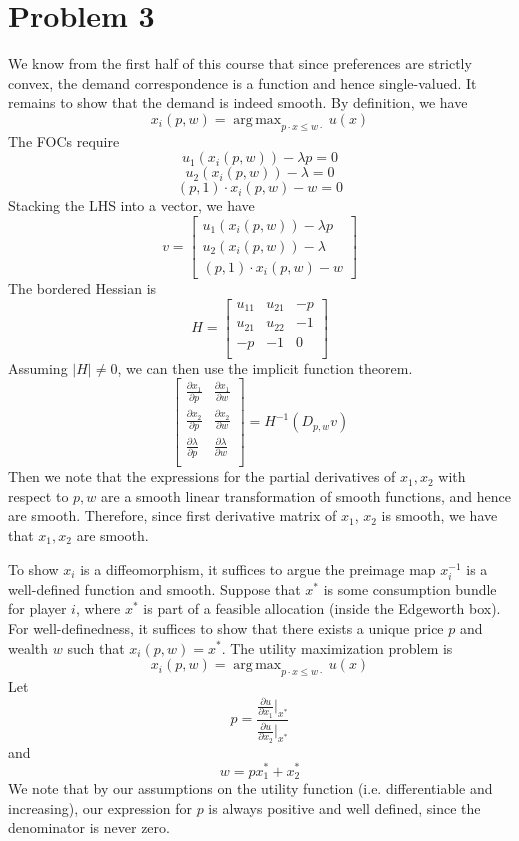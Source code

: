 \documentclass[10pt,letter]{article}
\DeclareMathOperator*{\argmax}{arg\,max}
\begin{document}
\section*{Problem 3}
We know from the first half of this course that since preferences are strictly convex, the demand correspondence is a function and hence single-valued. It remains to show that the demand is indeed smooth.
By definition, we have
\[ x_i(p,w) = \argmax_{p\cdot x \le w \cdot } u(x) \]
The FOCs require
\[ u_1(x_i(p,w)) - \lambda p = 0 \]
\[ u_2(x_i(p,w)) - \lambda = 0 \]
\[ (p,1) \cdot x_i(p,w) - w  = 0\]
Stacking the LHS into a vector, we have
\[ v = \begin{bmatrix}
  u_1(x_i(p,w)) - \lambda p \\
  u_2(x_i(p,w)) - \lambda  \\
  (p, 1) \cdot x_i(p,w) - w
\end{bmatrix} \]
The bordered Hessian is
\[ H = \begin{bmatrix} u_{11} & u_{21} & -p \\ u_{21} & u_{22} & -1 \\ -p & -1 & 0 \\ \end{bmatrix}\]
Assuming $|H| \neq 0$, we can then use the implicit function theorem.
\[ \begin{bmatrix}
  \frac{\partial x_1}{\partial p} & \frac{\partial x_1}{\partial w} \\  \frac{\partial x_2}{\partial p} & \frac{\partial x_2}{\partial w}  \\ \frac{\partial \lambda}{\partial p} & \frac{\partial \lambda}{\partial w}  \\
\end{bmatrix} = H^{-1} (D_{p,w} v) \]
Then we note that the expressions for the partial derivatives of $x_1, x_2$ with respect to $p, w$ are a smooth linear transformation of smooth functions, and hence are smooth. Therefore, since first derivative matrix of $x_1$, $x_2$ is smooth, we have that $x_1, x_2$ are smooth.

To show $x_i$ is a diffeomorphism, it suffices to argue the preimage map $x_i^{-1}$ is a well-defined function and smooth. Suppose that $x^*$ is some consumption bundle for player $i$, where $x^*$ is part of a feasible allocation (inside the Edgeworth box). For well-definedness, it suffices to show that there exists a unique price $p$ and wealth $w$ such that $x_i(p,w) = x^*$. The utility maximization problem is
\[ x_i(p,w) = \argmax_{p\cdot x \le w \cdot } u(x) \]
Let
\[ p = \frac{\frac{\partial u}{\partial x_1} \Bigr|_{ x^*}}{\frac{\partial u}{\partial x_2} \Bigr|_{x^*}} \]
and
\[ w = p x^*_1 + x^*_2  \]
We note that by our assumptions on the utility function (i.e. differentiable and increasing), our expression for $p$ is always positive and well defined, since the denominator is never zero.
\end{document}
